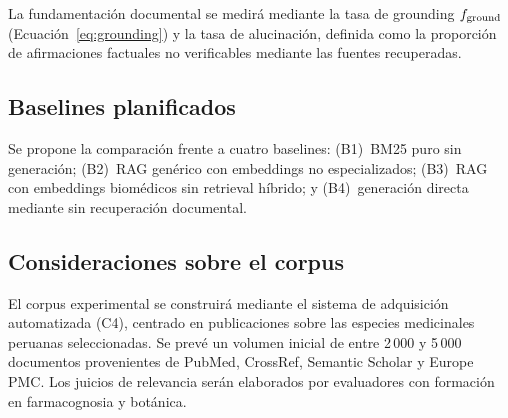 La fundamentación documental se medirá mediante la tasa de grounding $f_{\text{ground}}$ (Ecuación~\ref{eq:grounding}) y la tasa de alucinación, definida como la proporción de afirmaciones factuales no verificables mediante las fuentes recuperadas.

\subsection{Baselines planificados}
\label{subsec:exp_baselines}

Se propone la comparación frente a cuatro baselines: (B1)~BM25 puro sin generación; (B2)~RAG genérico con embeddings no especializados; (B3)~RAG con embeddings biomédicos sin retrieval híbrido; y (B4)~generación directa mediante \llm{} sin recuperación documental.

\subsection{Consideraciones sobre el corpus}
\label{subsec:exp_corpus}

El corpus experimental se construirá mediante el sistema de adquisición automatizada (C4), centrado en publicaciones sobre las especies medicinales peruanas seleccionadas. Se prevé un volumen inicial de entre 2\,000 y 5\,000 documentos provenientes de PubMed, CrossRef, Semantic Scholar y Europe PMC. Los juicios de relevancia serán elaborados por evaluadores con formación en farmacognosia y botánica.
